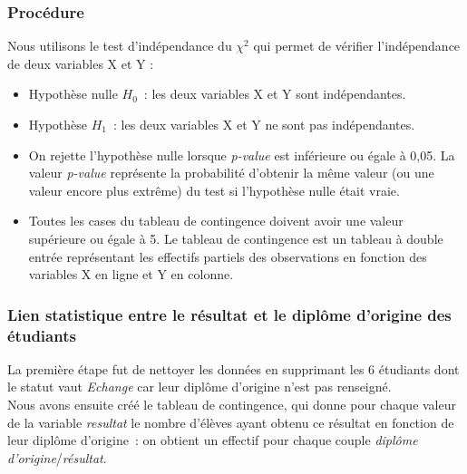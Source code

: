 \documentclass[a4paper,10pt]{report}
\begin{document}
\subsubsection{Procédure}

Nous utilisons le test d'indépendance du $\chi^2$ qui permet de vérifier l'indépendance de deux variables X et Y : 

\begin{itemize}
	\item Hypothèse nulle $H_{0}$~: les deux variables X et Y sont indépendantes.
	\item Hypothèse $H_{1}$~: les deux variables X et Y ne sont pas indépendantes.
	\item On rejette l'hypothèse nulle lorsque \textit{p-value} est inférieure ou égale à 0,05. La valeur \textit{p-value} représente la probabilité d'obtenir la même valeur (ou une valeur encore plus extrême) du test si l'hypothèse nulle était vraie.
	\item Toutes les cases du tableau de contingence doivent avoir une valeur supérieure ou égale à 5. Le tableau de contingence est un tableau à double entrée représentant les effectifs partiels des observations en fonction des variables X en ligne et Y en colonne.
\end{itemize}





\subsubsection{Lien statistique entre le résultat et le diplôme d'origine des étudiants}
La première étape fut de nettoyer les données en supprimant les 6 étudiants dont le statut vaut \textit{Echange} car leur diplôme d'origine n'est pas renseigné.\\
Nous avons ensuite créé le tableau de contingence, qui donne pour chaque valeur de la variable \textit{resultat} le nombre d'élèves ayant obtenu ce résultat en fonction de leur diplôme d'origine~: on obtient un effectif pour chaque couple \textit{diplôme d'origine}/\textit{résultat}.
\end{document}
